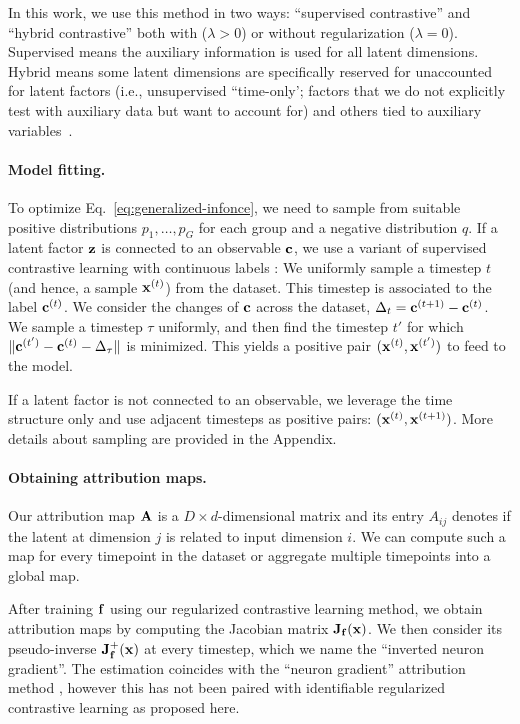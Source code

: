     In this work, we use this method in two ways: ``supervised contrastive'' and ``hybrid contrastive'' both with ($\lambda > 0$) or without regularization ($\lambda = 0$). Supervised means the auxiliary information is used for all latent dimensions. Hybrid means some latent dimensions are specifically reserved for unaccounted for latent factors (i.e., unsupervised ``time-only'; factors that we do not explicitly test with auxiliary data but want to account for) and others tied to auxiliary variables~\citep{schneider2023cebra}.


    \paragraph{Model fitting.}

        To optimize Eq.~\ref{eq:generalized-infonce}, we need to sample from suitable positive distributions $p_1,\dots,p_G$ for each group and a negative distribution $q$.
        If a latent factor $\zz$ is connected to an observable $\cc$, we use a variant of supervised contrastive learning with continuous labels \citep{schneider2023cebra}: We uniformly sample a timestep $t$ (and hence, a sample $\xx^{(t)}$) from the dataset. This timestep is associated to the label $\cc^{(t)}$. 
        We consider the changes of $\cc$ across the dataset, $\Delta_t = \cc^{(t+1)} - \cc^{(t)}$. We sample a timestep $\tau$ uniformly, and then find the timestep $t'$ for which $\|\cc^{(t')} - \cc^{(t)} - \Delta_{\tau}\|$ is minimized.
        This yields a positive pair $(\xx^{(t)}, \xx^{(t')})$ to feed to the model.

        If a latent factor is not connected to an observable, we leverage the time structure only \citep{hyvarinen17pcl,hyvarinen2019nonlinear} and use adjacent timesteps as positive pairs: $(\xx^{(t)}, \xx^{(t+1)})$.
        More details about sampling are provided in the Appendix. 
    
    \paragraph{Obtaining attribution maps.}

        Our attribution map $\AA$ is a $D \times d$-dimensional matrix and its entry $A_{ij}$ denotes if the latent at dimension $j$ is related to input dimension $i$. We can compute such a map for every timepoint in the dataset or aggregate multiple timepoints into a global map.

        After training $\ff$ using our regularized contrastive learning method, we obtain attribution maps by computing the Jacobian matrix $\JJ_\ff(\xx)$. We then consider its pseudo-inverse $\JJ_\ff^+(\xx)$ at every timestep,  which we name the ``inverted neuron gradient''. The estimation coincides with the ``neuron gradient'' attribution method \citep{Simonyan2013DeepIC}, however this has not been paired with identifiable regularized contrastive learning as proposed here. 

